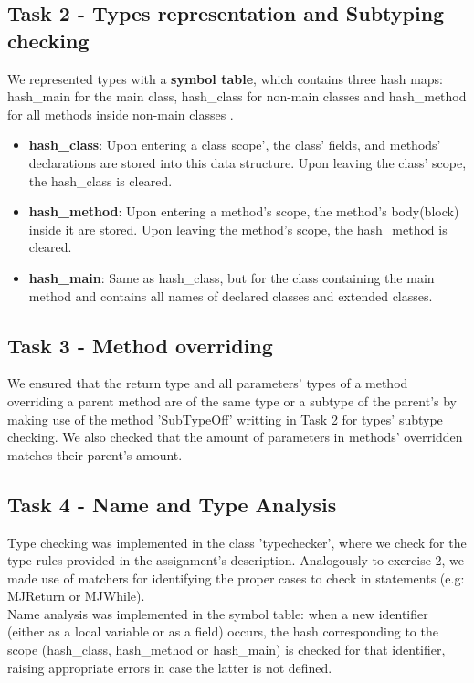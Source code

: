 \documentclass[paper=a4, fontsize=11pt]{scrartcl}
\numberwithin{equation}{section}		%
\numberwithin{figure}{section}			%
\numberwithin{table}{section}				%
\begin{document}
\subsection*{Task 2 - Types representation and Subtyping checking}
We represented types with a \textbf{symbol table}, which contains three hash maps: hash\_main for the main class, hash\_class for non-main classes and hash\_method for all methods inside non-main classes \cite{California}.\\
\begin{itemize}
	\item \textbf{hash\_class}: Upon entering a class scope', the class' fields, and methods' declarations are stored into this data structure. Upon leaving the class' scope, the hash\_class is cleared.
	\item \textbf{hash\_method}: Upon entering a method's scope, the method's body(block) inside it are stored. Upon leaving the method's scope, the hash\_method is cleared.
	\item \textbf{hash\_main}: Same as hash\_class, but for the class containing the main method and contains all names of declared classes and extended classes. 
\end{itemize}

\subsection*{Task 3 - Method overriding}
We ensured that the return type and all parameters' types of a method overriding a parent method are of the same type or a subtype of the parent's by making use of the method 'SubTypeOff' writting in Task 2 for types' subtype checking. We also checked that the amount of parameters in methods' overridden matches their parent's amount. 
\subsection*{Task 4 - Name and Type Analysis}
Type checking was implemented in the class 'typechecker', where we check for the type rules provided in the assignment's description. Analogously to exercise 2, we made use of matchers for identifying the proper cases to check in statements (e.g: MJReturn or MJWhile). \\
Name analysis was implemented in the symbol table: when a new identifier (either as a local variable or as a field) occurs, the hash corresponding to the scope (hash\_class, hash\_method or hash\_main) is checked for that identifier, raising appropriate errors in case the latter is not defined. 
\end{document}
